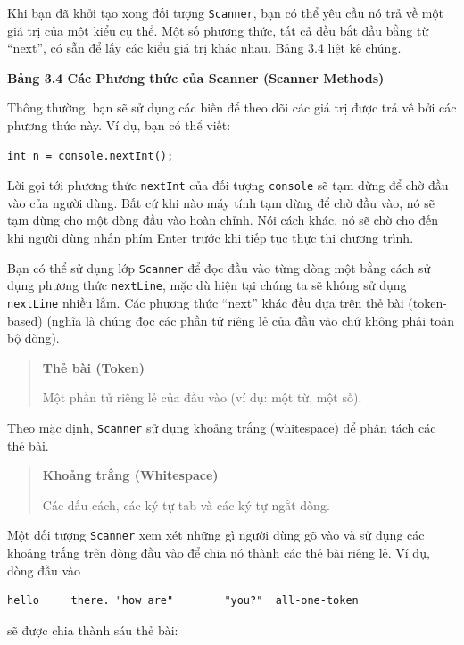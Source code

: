 Khi bạn đã khởi tạo xong đối tượng \texttt{Scanner}, bạn có thể yêu cầu
nó trả về một giá trị của một kiểu cụ thể. Một số phương thức, tất cả
đều bắt đầu bằng từ ``next'', có sẵn để lấy các kiểu giá trị khác nhau.
Bảng 3.4 liệt kê chúng.

\textbf{Bảng 3.4 Các Phương thức của Scanner (Scanner Methods)}

Thông thường, bạn sẽ sử dụng các biến để theo dõi các giá trị được trả
về bởi các phương thức này. Ví dụ, bạn có thể viết:

\begin{verbatim}
int n = console.nextInt();
\end{verbatim}

Lời gọi tới phương thức \texttt{nextInt} của đối tượng \texttt{console}
sẽ tạm dừng để chờ đầu vào của người dùng. Bất cứ khi nào máy tính tạm
dừng để chờ đầu vào, nó sẽ tạm dừng cho một dòng đầu vào hoàn chỉnh. Nói
cách khác, nó sẽ chờ cho đến khi người dùng nhấn phím Enter trước khi
tiếp tục thực thi chương trình.

Bạn có thể sử dụng lớp \texttt{Scanner} để đọc đầu vào từng dòng một
bằng cách sử dụng phương thức \texttt{nextLine}, mặc dù hiện tại chúng
ta sẽ không sử dụng \texttt{nextLine} nhiều lắm. Các phương thức
``next'' khác đều dựa trên thẻ bài (token-based) (nghĩa là chúng đọc các
phần tử riêng lẻ của đầu vào chứ không phải toàn bộ dòng).

\begin{quote}
\textbf{Thẻ bài (Token)}

Một phần tử riêng lẻ của đầu vào (ví dụ: một từ, một số).
\end{quote}

Theo mặc định, \texttt{Scanner} sử dụng khoảng trắng (whitespace) để
phân tách các thẻ bài.

\begin{quote}
\textbf{Khoảng trắng (Whitespace)}

Các dấu cách, các ký tự tab và các ký tự ngắt dòng.
\end{quote}

Một đối tượng \texttt{Scanner} xem xét những gì người dùng gõ vào và sử
dụng các khoảng trắng trên dòng đầu vào để chia nó thành các thẻ bài
riêng lẻ. Ví dụ, dòng đầu vào

\begin{verbatim}
hello     there. "how are"        "you?"  all-one-token
\end{verbatim}

sẽ được chia thành sáu thẻ bài:

